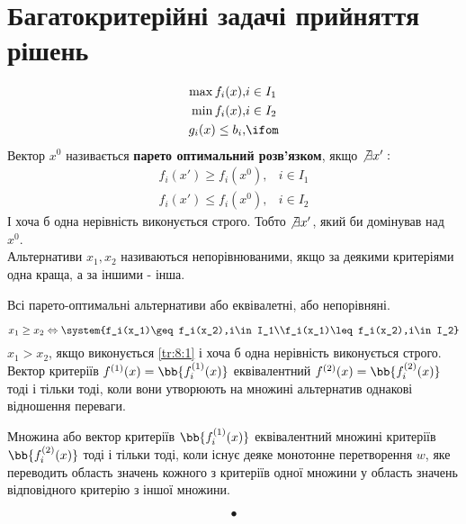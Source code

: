 \section{Багатокритерійні задачі прийняття рішень}
\begin{eqnarray}
\max f_i(x),&i\in I_1\\
\min f_i(x),&i\in I_2\\
g_i(x) \leq b_i,&\ifom
\end{eqnarray}
Вектор $x^0$ називається \textbf{парето оптимальний розв’язком}, якщо $\not\exists x': $
\begin{eqnarray}
f_i(x') \geq f_i(x^0),&i\in I_1\\
f_i(x') \leq f_i(x^0),&i\in I_2
\end{eqnarray}
І хоча б одна нерівність виконується строго. Тобто $\not\exists x'$, який би домінував над $x^0$.\\
Альтернативи $x_1,x_2$ називаються непорівнюваними, якщо за деякими критеріями одна краща, а за іншими - інша.\\
\begin{tver}
Всі парето-оптимальні альтернативи або еквівалетні, або непорівняні.
\end{tver}
\begin{equation}\label{tr:8:1}
x_1 \geq x_2 \Leftrightarrow \system{f_i(x_1)\geq f_i(x_2),i\in I_1\\f_i(x_1)\leq f_i(x_2),i\in I_2}
\end{equation}
$x_1 > x_2$, якщо виконується \eqref{tr:8:1} і хоча б одна нерівність виконується строго.\\
Вектор критеріїв $f^{(1)}(x) = \bb{f_i^{(1)}(x)}$ еквівалентний $f^{(2)}(x) = \bb{f_i^{(2)}(x)}$ тоді і тільки тоді, коли вони утворюють на множині альтернатив однакові відношення переваги. 
\begin{teor}
Множина або вектор критеріїв $ \bb{f_i^{(1)}(x)}$ еквівалентний множині критеріїв $\bb{f_i^{(2)}(x)}$ тоді і тільки тоді, коли існує деяке монотонне перетворення $w$, яке переводить область значень кожного з критеріїв одної множини у область значень відповідного критерію з іншої множини.
\end{teor}
\begin{equation}
•
\end{equation}